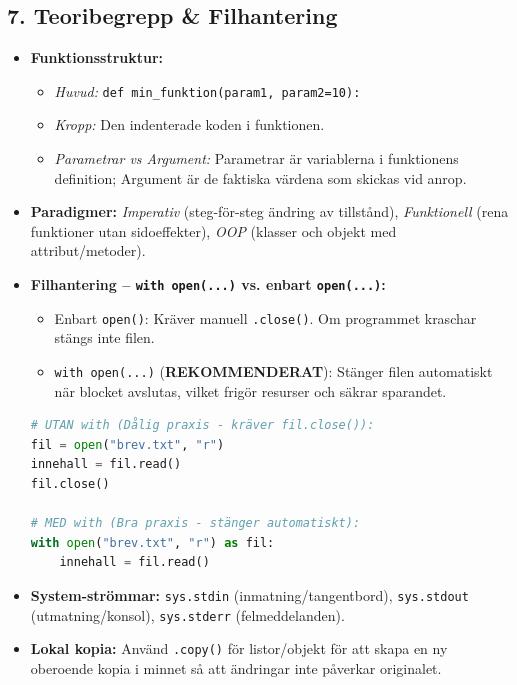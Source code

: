 \documentclass{article}
\begin{document}
\subsection*{7. Teoribegrepp \& Filhantering}
\begin{itemize}
    \item \textbf{Funktionsstruktur:}
    \begin{itemize}
        \item \textit{Huvud:} \texttt{def min\_funktion(param1, param2=10):}
        \item \textit{Kropp:} Den indenterade koden i funktionen.
        \item \textit{Parametrar vs Argument:} Parametrar är variablerna i funktionens definition; Argument är de faktiska värdena som skickas vid anrop.
    \end{itemize}
    \item \textbf{Paradigmer:} \textit{Imperativ} (steg-för-steg ändring av tillstånd), \textit{Funktionell} (rena funktioner utan sidoeffekter), \textit{OOP} (klasser och objekt med attribut/metoder).
    \item \textbf{Filhantering -- \texttt{with open(...)} vs. enbart \texttt{open(...)}:}
    \begin{itemize}
        \item Enbart \texttt{open()}: Kräver manuell \texttt{.close()}. Om programmet kraschar stängs inte filen.
        \item \texttt{with open(...)} (\textbf{REKOMMENDERAT}): Stänger filen automatiskt när blocket avslutas, vilket frigör resurser och säkrar sparandet.
    \end{itemize}
\begin{lstlisting}[language=Python]
# UTAN with (Dålig praxis - kräver fil.close()):
fil = open("brev.txt", "r")
innehall = fil.read()
fil.close()

# MED with (Bra praxis - stänger automatiskt):
with open("brev.txt", "r") as fil:
    innehall = fil.read()
\end{lstlisting}
    \item \textbf{System-strömmar:} \texttt{sys.stdin} (inmatning/tangentbord), \texttt{sys.stdout} (utmatning/konsol), \texttt{sys.stderr} (felmeddelanden).
    \item \textbf{Lokal kopia:} Använd \texttt{.copy()} för listor/objekt för att skapa en ny oberoende kopia i minnet så att ändringar inte påverkar originalet.
\end{itemize}
\end{document}
